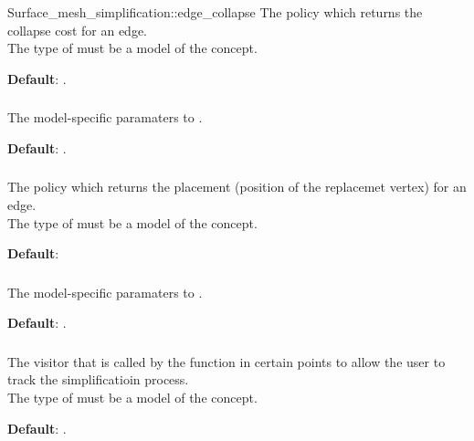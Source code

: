 \begin{ccRefFunction}{Surface_mesh_simplification::edge_collapse}
The policy which returns the collapse cost for an edge.\\
The type of  must be a model of the  concept.

\textbf{Default}: 
.

\subsubsection{}

The model-specific paramaters to .

\textbf{Default}: .

\subsubsection{}

The policy which returns the placement (position of the replacemet vertex)
for an edge.\\
The type of  must be a model of the  concept.

\textbf{Default}: 

\subsubsection{}

The model-specific paramaters to .

\textbf{Default}: .

\subsubsection{}

The visitor that is called by the  function
in certain points to allow the user to track the simplificatioin process.\\
The type of  must be a model of the  concept.

\textbf{Default}: .



\end{ccRefFunction}
